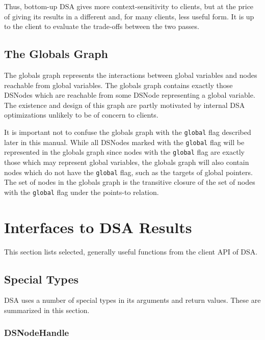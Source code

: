 \documentclass{article}
\begin{document}
Thus, bottom-up DSA gives more context-sensitivity to clients, but at
the price of giving its results in a different and, for many clients,
less useful form.  It is up to the client to evaluate the trade-offs
between the two passes.

\subsection{The Globals Graph}

The globals graph represents the interactions between global variables
and nodes reachable from global variables.  The globals graph contains
exactly those DSNodes which are reachable from some DSNode
representing a global variable.  The existence and design of this
graph are partly motivated by internal DSA optimizations unlikely to be
of concern to clients.

It is important not to confuse the globals graph with the
\texttt{global} flag described later in this manual.  While all
DSNodes marked with the \texttt{global} flag will be represented in
the globals graph since nodes with the \texttt{global} flag are
exactly those which may represent global variables, the globals graph
will also contain nodes which do not have the \texttt{global} flag,
such as the targets of global pointers.  The set of nodes in the
globals graph is the transitive closure of the set of nodes with the
\texttt{global} flag under the points-to relation.

\section{Interfaces to DSA Results}


This section lists selected, generally useful functions from the
client API of DSA.

\subsection{Special Types}

DSA uses a number of special types in its arguments and return
values.  These are summarized in this section.

\subsubsection{DSNodeHandle}
\end{document}
